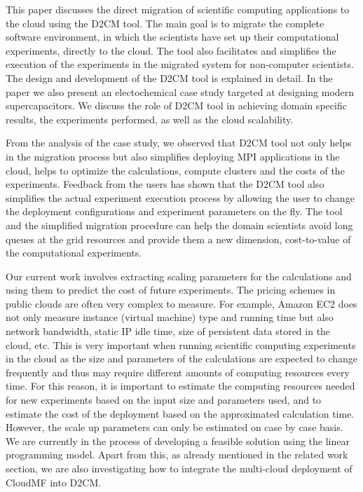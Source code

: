 \documentclass[a4paper,10pt]{article}
\begin{document}
This paper discusses the direct migration of scientific computing applications to the cloud using the D2CM tool. The main goal is to migrate the complete software environment, in which the scientists have set up their computational experiments, directly to the cloud.  The tool also facilitates and simplifies the execution of the experiments in the migrated system for non-computer scientists. The design and development of the D2CM tool is explained in detail. In the paper we also present an electochemical case study targeted at designing modern supercapacitors. We discuss the role of D2CM tool in achieving domain specific results, the experiments performed, as well as the cloud scalability.  





From the analysis of the case study, we observed that D2CM tool not only helps in the migration process but also simplifies deploying MPI applications in the cloud, helps to optimize the calculations, compute clusters and the costs of the experiments. Feedback from the users has shown that the D2CM tool also simplifies the actual experiment execution process by allowing the user to change the deployment configurations and experiment parameters on the fly. The tool and the simplified migration procedure can help the domain scientists avoid long queues at the grid resources and provide them a new dimension, cost-to-value of the computational experiments.

Our current work involves extracting scaling parameters for the calculations and using them to predict the cost of future experiments. The pricing schemes in public clouds are often very complex to measure. For example, Amazon EC2 does not only measure instance (virtual machine) type and running time but also network bandwidth, static IP idle time, size of persistent data stored in the cloud, etc. This is very important when running scientific computing experiments in the cloud as the size and parameters of the calculations are expected to change frequently and thus may require different amounts of computing resources every time. For this reason, it is important to estimate the computing resources needed for new experiments based on the input size and parameters used, and to estimate the cost of the deployment based on the approximated calculation time. However, the scale up parameters can only be estimated on case by case basis. We are currently in the process of developing a feasible solution using the linear programming model.
Apart from this, as already mentioned in the related work section, we are also investigating how to integrate the multi-cloud deployment of CloudMF into D2CM.
\end{document}
